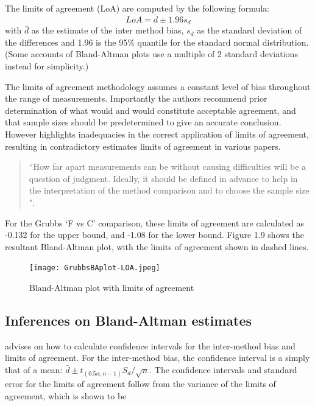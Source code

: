 \documentclass[12pt, a4paper]{report}
\theoremstyle{plain}
\theoremstyle{definition}
\theoremstyle{remark}
\begin{document}
The limits of agreement (LoA) are computed by the following
formula:
\[
LoA = \bar{d} \pm 1.96 s_{d}
\]
with $\bar{d}$ as the estimate of the inter method bias, $s_{d}$
as the standard deviation of the differences and 1.96 is the 95\%
quantile for the standard normal distribution. (Some accounts of
Bland-Altman plots use a multiple of 2 standard deviations instead
for simplicity.)

The limits of agreement methodology assumes a constant level of bias throughout the range of measurements. Importantly the authors recommend prior determination of what would and would constitute acceptable
agreement, and that sample sizes should be predetermined to give an accurate conclusion. However \citet{mantha} highlights inadequacies in the correct application of limits of agreement, resulting in contradictory estimates limits of agreement in various papers.

\begin{quote}
``How far apart measurements can be without causing difficulties
will be a question of judgment. Ideally, it should be defined in
advance to help in the interpretation of the method comparison and
to choose the sample size \citep{BA86}".
\end{quote}


For the Grubbs `F vs C' comparison, these limits
of agreement are calculated as -0.132 for the upper bound, and
-1.08 for the lower bound. Figure 1.9 shows the resultant
Bland-Altman plot, with the limits of agreement shown in dashed
lines.


\begin{figure}[h!]
\begin{center}
  \texttt{[image: GrubbsBAplot-LOA.jpeg]}
  \caption{Bland-Altman plot with limits of agreement}\label{GrubbsBAplot-noLOA}
\end{center}
\end{figure}


\subsection{Inferences on Bland-Altman estimates}
\citet*{BA99}advises on how to calculate confidence intervals for the inter-method bias and limits of agreement.
For the inter-method bias, the confidence interval is a simply that of a mean: $\bar{d} \pm t_{(0.5\alpha,n-1)} S_{d}/\sqrt{n}$.
The confidence
intervals and standard error for the limits of agreement follow from the variance of the limits of agreement, which is shown to be
\end{document}
